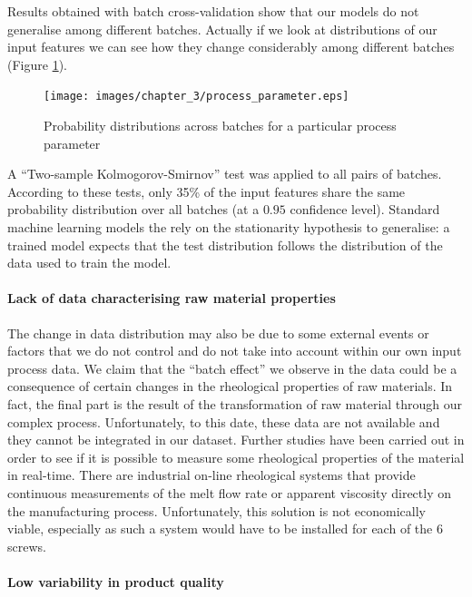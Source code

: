 Results obtained with batch cross-validation show that our models do not generalise among different batches. Actually if we look at distributions of our input features we can see how they change considerably among different batches (Figure \ref{fig:Example of a process parameter variability in probability distribution}). 
%
\begin{figure}
\centerline{\texttt{[image: images/chapter\_3/process\_parameter.eps]}}
\caption{Probability distributions across batches for a particular process parameter}
\label{fig:Example of a process parameter variability in probability distribution}
\end{figure}
%
A “Two-sample Kolmogorov-Smirnov” test was applied to all pairs of batches. According to these tests, only 35\% of the input features share the same probability distribution over all batches (at a $0.95$ confidence level).
Standard machine learning models the rely on the stationarity hypothesis to generalise: a trained model expects that the test distribution follows the distribution of the data used to train the model.

\paragraph{Lack of data characterising raw material properties}

The change in data distribution may also be due to some external events or factors that we do not control and do not take into account within our own input process data. We claim that the ``batch effect'' we observe in the data could be a consequence of certain changes in the rheological properties of raw materials. In fact, the final part is the result of the transformation of raw material through our complex process. Unfortunately, to this date, these data are not available and they cannot be integrated in our dataset. Further studies have been carried out in order to see if it is possible to measure some rheological properties of the material in real-time. There are industrial on-line rheological systems that provide continuous measurements of the melt flow rate or apparent viscosity directly on the manufacturing process. Unfortunately, this solution is not economically viable, especially as such a system would have to be installed for each of the 6 screws.

\paragraph{Low variability in product quality}

